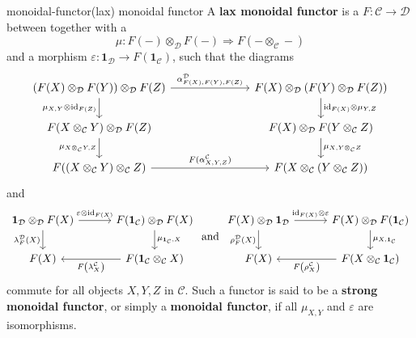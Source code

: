 \begin{topic}{monoidal-functor}{(lax) monoidal functor}
    A \textbf{lax monoidal functor} is a  $F \colon \mathcal{C} \to \mathcal{D}$ between  together with a 
    \[ \mu \colon F(-) \otimes_\mathcal{D} F(-) \Rightarrow F(- \otimes_\mathcal{C} -) \]
    and a morphism $\varepsilon \colon \textbf{1}_\mathcal{D} \to F(\textbf{1}_\mathcal{C})$, such that the diagrams
    \[ \svg \begin{tikzcd}[column sep=7em]
        (F(X) \otimes_\mathcal{D} F(Y)) \otimes_\mathcal{D} F(Z) \arrow{r}{\alpha^\mathcal{D}_{F(X), F(Y), F(Z)}} \arrow[swap]{d}{\mu_{X, Y} \otimes \id_{F(Z)}} & F(X) \otimes_\mathcal{D} (F(Y) \otimes_\mathcal{D} F(Z)) \arrow{d}{\id_{F(X)} \otimes \mu_{Y, Z}} \\ F(X \otimes_\mathcal{C} Y) \otimes_\mathcal{D} F(Z) \arrow[swap]{d}{\mu_{X \otimes_\mathcal{C} Y, Z}} &  F(X) \otimes_\mathcal{D} F(Y \otimes_\mathcal{C} Z) \arrow{d}{\mu_{X, Y \otimes_\mathcal{C} Z}} \\ F((X \otimes_\mathcal{C} Y) \otimes_\mathcal{C} Z) \arrow{r}{F(\alpha^\mathcal{C}_{X, Y, Z})} & F(X \otimes_\mathcal{C} (Y \otimes_\mathcal{C} Z))
    \end{tikzcd} \]
    and
    \[ \svg \begin{tikzcd}[column sep=3em]
        \textbf{1}_\mathcal{D} \otimes_\mathcal{D} F(X) \arrow{r}{\varepsilon \otimes \id_{F(X)}} \arrow[swap]{d}{\lambda^\mathcal{D}_F(X)} & F(\textbf{1}_\mathcal{C}) \otimes_\mathcal{D} F(X) \arrow{d}{\mu_{\textbf{1}_\mathcal{C}, X}} \\ F(X) & F(\textbf{1}_\mathcal{C} \otimes_\mathcal{C} X) \arrow{l}{F \left(\lambda^\mathcal{C}_X \right)}
    \end{tikzcd} \text{ and } \begin{tikzcd}[column sep=3em]
        F(X) \otimes_\mathcal{D} \textbf{1}_\mathcal{D} \arrow{r}{\id_{F(X)} \otimes \varepsilon} \arrow[swap]{d}{\rho^\mathcal{D}_F(X)} & F(X) \otimes_\mathcal{D} F(\textbf{1}_\mathcal{C}) \arrow{d}{\mu_{X, \textbf{1}_\mathcal{C}}} \\ F(X) & F(X \otimes_\mathcal{C} \textbf{1}_\mathcal{C}) \arrow{l}{F \left(\rho^\mathcal{C}_X \right)}
    \end{tikzcd} \]
    commute for all objects $X, Y, Z$ in $\mathcal{C}$. Such a functor is said to be a \textbf{strong monoidal functor}, or simply a \textbf{monoidal functor}, if all $\mu_{X, Y}$ and $\varepsilon$ are isomorphisms.
\end{topic}

